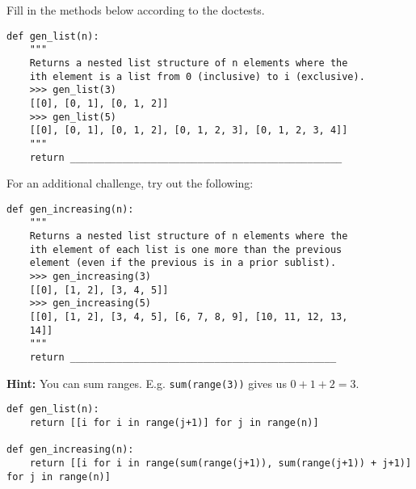 \begin{blocksection}
\question Fill in the methods below according to the doctests.
\end{blocksection}

\begin{lstlisting}
def gen_list(n):
    """
    Returns a nested list structure of n elements where the 
    ith element is a list from 0 (inclusive) to i (exclusive).
    >>> gen_list(3)
    [[0], [0, 1], [0, 1, 2]]
    >>> gen_list(5)
    [[0], [0, 1], [0, 1, 2], [0, 1, 2, 3], [0, 1, 2, 3, 4]]
    """
    return _______________________________________________
\end{lstlisting}

For an additional challenge, try out the following:

\begin{lstlisting}
def gen_increasing(n):
    """
    Returns a nested list structure of n elements where the 
    ith element of each list is one more than the previous 
    element (even if the previous is in a prior sublist).
    >>> gen_increasing(3)
    [[0], [1, 2], [3, 4, 5]]
    >>> gen_increasing(5)
    [[0], [1, 2], [3, 4, 5], [6, 7, 8, 9], [10, 11, 12, 13, 
    14]]
    """
    return ______________________________________________
\end{lstlisting}

\textbf{Hint:} You can sum ranges. E.g. \texttt{sum(range(3))} gives us $0 + 1 + 2 = 3$.

\begin{solution}
\begin{lstlisting}
def gen_list(n):
    return [[i for i in range(j+1)] for j in range(n)]

def gen_increasing(n):
	return [[i for i in range(sum(range(j+1)), sum(range(j+1)) + j+1)] for j in range(n)]
\end{lstlisting}
\end{solution}